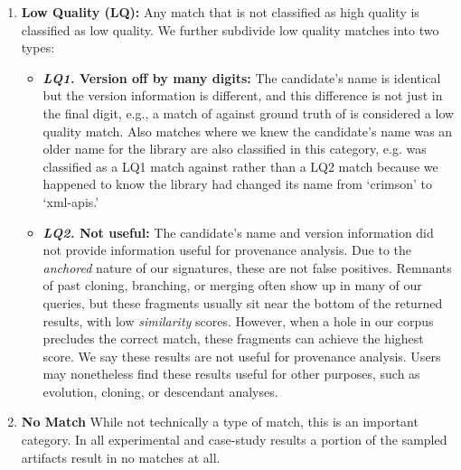 \begin{enumerate}
\vspace{0.7em}
\item \textbf{Low Quality (LQ):}
      Any match that is not classified as high quality is classified as low
      quality.  We further subdivide low quality matches into two types:

\begin{itemize}

\vspace{0.7em}
\item \textbf{\emph{LQ1.} Version off by many digits:}
    The candidate's name is identical but the version information is
    different, and this difference is not just in the final digit, e.g.,  a
    match of  against ground truth of
     is considered a low quality match.  Also
    matches where we knew the candidate's name was an older name for the
    library are also classified in this category, e.g.
     was classified as a LQ1 match
    against  rather than a LQ2 match because we
    happened to know the library had changed its name from `crimson' to
    `xml-apis.'

\vspace{0.7em}
\item \textbf{\emph{LQ2.} Not useful:}
    The candidate's name and version information did not provide
    information useful for provenance analysis.  Due to the \emph{anchored}
    nature of our signatures, these are not false positives.  Remnants of
    past cloning, branching, or merging often show up in many of our
    queries, but these fragments usually sit near the bottom of the
    returned results, with low \emph{similarity} scores.  However, when a
    hole in our corpus precludes the correct match, these fragments can
    achieve the highest score.  We say these results are not useful for
    provenance analysis.  Users may nonetheless find these results useful
    for other purposes, such as evolution, cloning, or descendant analyses.




\end{itemize}

\vspace{0.7em}
\item \textbf{No Match}
      While not technically a type of match, this is an important category.
      In all experimental and case-study results a portion of the sampled
      artifacts result in no matches at all.

\end{enumerate}



